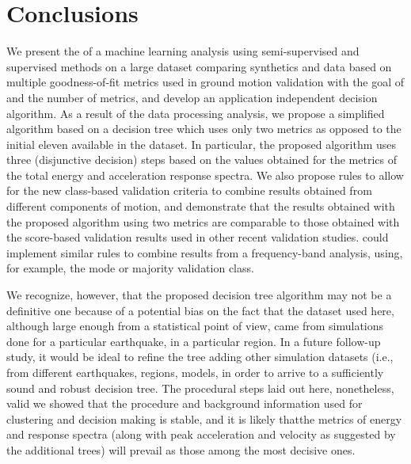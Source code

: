 
\section{Conclusions}

We present the  of a machine learning analysis using semi-supervised and supervised methods on a large dataset comparing synthetics and data based on multiple goodness-of-fit metrics used in ground motion validation with the goal of  and  the number of metrics, and develop an application independent decision algorithm. As a result of the data processing analysis, we propose a simplified algorithm based on a decision tree which uses only two metrics as opposed to the initial eleven available in the dataset. In particular, the proposed algorithm uses three (disjunctive decision) steps based on the values obtained for the metrics of the total energy and acceleration response spectra. We also propose rules to allow for the new class-based validation criteria to combine results obtained from different components of motion, and demonstrate that the results obtained with the proposed algorithm using two metrics are comparable to those obtained with the score-based validation results used in other recent validation studies.  could implement similar rules to combine results from a frequency-band analysis, using, for example, the mode or majority validation class. 

We recognize, however, that the proposed decision tree algorithm may not be a definitive one because of a potential bias on the fact that the dataset used here, although large enough from a statistical point of view, came from simulations done for a particular earthquake, in a particular region. In a future follow-up study, it would be ideal to refine the tree adding other simulation datasets (i.e., from different earthquakes, regions, models,  in order to arrive to a sufficiently sound and robust decision tree. The procedural steps laid out here, nonetheless,  valid we showed that the procedure and background information used for clustering and decision making is stable, and it is likely thatthe metrics of energy and response spectra (along with peak acceleration and velocity as suggested by the additional trees) will prevail as those among the most decisive ones.

